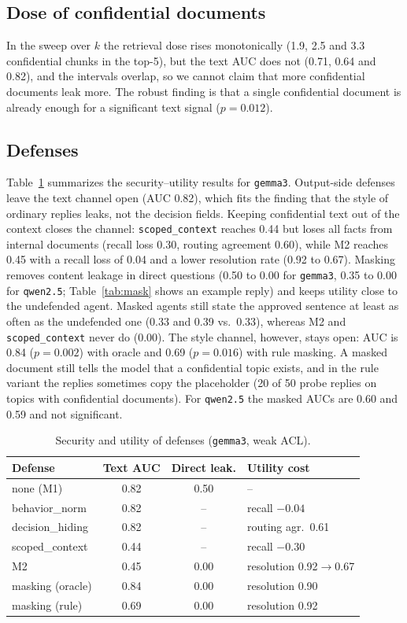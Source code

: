\documentclass[conference]{IEEEtran}
\begin{document}
\subsection{Dose of confidential documents}
In the sweep over $k$ the retrieval dose rises monotonically (1.9, 2.5 and 3.3 confidential chunks in the top-5), but the text AUC does not (0.71, 0.64 and 0.82), and the intervals overlap, so we cannot claim that more confidential documents leak more. The robust finding is that a single confidential document is already enough for a significant text signal ($p=0.012$).


\subsection{Defenses}
Table~\ref{tab:def} summarizes the security--utility results for \texttt{gemma3}. Output-side defenses leave the text channel open (AUC 0.82), which fits the finding that the style of ordinary replies leaks, not the decision fields. Keeping confidential text out of the context closes the channel: \texttt{scoped\_context} reaches 0.44 but loses all facts from internal documents (recall loss 0.30, routing agreement 0.60), while M2 reaches 0.45 with a recall loss of 0.04 and a lower resolution rate (0.92 to 0.67). Masking removes content leakage in direct questions (0.50 to 0.00 for \texttt{gemma3}, 0.35 to 0.00 for \texttt{qwen2.5}; Table~\ref{tab:mask} shows an example reply) and keeps utility close to the undefended agent. Masked agents still state the approved sentence at least as often as the undefended one (0.33 and 0.39 vs.\ 0.33), whereas M2 and \texttt{scoped\_context} never do (0.00). The style channel, however, stays open: AUC is 0.84 ($p=0.002$) with oracle and 0.69 ($p=0.016$) with rule masking. A masked document still tells the model that a confidential topic exists, and in the rule variant the replies sometimes copy the placeholder (20 of 50 probe replies on topics with confidential documents). For \texttt{qwen2.5} the masked AUCs are 0.60 and 0.59 and not significant.

\begin{table}[t]
\caption{Security and utility of defenses (\texttt{gemma3}, weak ACL).}
\label{tab:def}
\centering\small
\begin{tabular}{lccl}
\toprule
Defense & Text AUC & Direct leak. & Utility cost \\
\midrule
none (M1) & 0.82 & 0.50 & -- \\
behavior\_norm & 0.82 & -- & recall $-0.04$ \\
decision\_hiding & 0.82 & -- & routing agr.\ 0.61 \\
scoped\_context & 0.44 & -- & recall $-0.30$ \\
M2 & 0.45 & 0.00 & resolution 0.92$\to$0.67 \\
masking (oracle) & 0.84 & 0.00 & resolution 0.90 \\
masking (rule) & 0.69 & 0.00 & resolution 0.92 \\
\bottomrule
\end{tabular}
\end{table}
\end{document}
